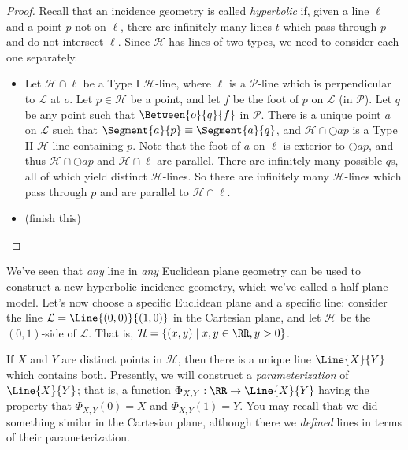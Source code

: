 \begin{proof}
Recall that an incidence geometry is called \emph{hyperbolic} if, given a line \(\ell\) and a point \(p\) not on \(\ell\), there are infinitely many lines \(t\) which pass through \(p\) and do not intersect \(\ell\).
Since \(\mathcal{H}\) has lines of two types, we need to consider each one separately.
\begin{itemize}
\item Let \(\mathcal{H} \cap \ell\) be a Type I \(\mathcal{H}\)-line, where \(\ell\) is a \(\mathcal{P}\)-line which is perpendicular to \(\mathcal{L}\) at \(o\).
Let \(p \in \mathcal{H}\) be a point, and let \(f\) be the foot of \(p\) on \(\mathcal{L}\) (in \(\mathcal{P}\)).
Let \(q\) be any point such that \(\Between{o}{q}{f}\) in \(\mathcal{P}\).
There is a unique point \(a\) on \(\mathcal{L}\) such that \(\Segment{a}{p} \equiv \Segment{a}{q}\), and \(\mathcal{H} \cap \Circle{a}{p}\) is a Type II \(\mathcal{H}\)-line containing \(p\).
Note that the foot of \(a\) on \(\ell\) is exterior to \(\Circle{a}{p}\), and thus \(\mathcal{H} \cap \Circle{a}{p}\) and \(\mathcal{H} \cap \ell\) are parallel.
There are infinitely many possible \(q\)s, all of which yield distinct \(\mathcal{H}\)-lines.
So there are infinitely many \(\mathcal{H}\)-lines which pass through \(p\) and are parallel to \(\mathcal{H} \cap \ell\).
\item (finish this) \qedhere
\end{itemize}
\end{proof}


We've seen that \emph{any} line in \emph{any} Euclidean plane geometry can be used to construct a new hyperbolic incidence geometry, which we've called a half-plane model.
Let's now choose a specific Euclidean plane and a specific line: consider the line \(\mathcal{L} = \Line{(0,0)}{(1,0)}\) in the Cartesian plane, and let \(\mathcal{H}\) be the \((0,1)\)-side of \(\mathcal{L}\).
That is, \(\mathcal{H} = \{ (x,y) \mid x,y \in \RR, y > 0 \}\).

If \(X\) and \(Y\) are distinct points in \(\mathcal{H}\), then there is a unique line \(\Line{X}{Y}\) which contains both.
Presently, we will construct a \emph{parameterization} of \(\Line{X}{Y}\); that is, a function \(\Phi_{X,Y} : \RR \rightarrow \Line{X}{Y}\) having the property that \(\Phi_{X,Y}(0) = X\) and \(\Phi_{X,Y}(1) = Y\).
You may recall that we did something similar in the Cartesian plane, although there we \emph{defined} lines in terms of their parameterization.

